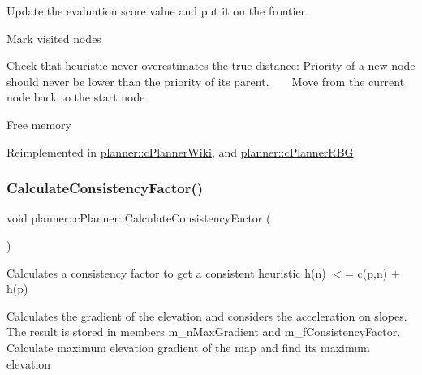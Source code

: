 Update the evaluation score value and put it on the frontier.

Mark visited nodes

Check that heuristic never overestimates the true distance\+: Priority of a new node should never be lower than the priority of its parent. ~\newline
~\newline
 Move from the current node back to the start node

Free memory 

Reimplemented in \mbox{\hyperlink{classplanner_1_1c_planner_wiki_a2652cf0e84d0a1fcd17e6c4288179955}{planner\+::c\+Planner\+Wiki}}, and \mbox{\hyperlink{classplanner_1_1c_planner_r_b_g_affd7011ef4df878a8e95ecf7f42c8e6f}{planner\+::c\+Planner\+R\+BG}}.

\mbox{\label{classplanner_1_1c_planner_a2e5a745f83f903662eff914d8beddb5e}} 
\subsubsection{\texorpdfstring{Calculate\+Consistency\+Factor()}{CalculateConsistencyFactor()}}
{\footnotesize\ttfamily void planner\+::c\+Planner\+::\+Calculate\+Consistency\+Factor (\begin{DoxyParamCaption}{ }\end{DoxyParamCaption})\hspace{0.3cm}{\ttfamily [protected]}}



Calculates a consistency factor to get a consistent heuristic h(n) $<$= c(p,n) + h(p) 

Calculates the gradient of the elevation and considers the acceleration on slopes. The result is stored in members m\+\_\+n\+Max\+Gradient and m\+\_\+f\+Consistency\+Factor. Calculate maximum elevation gradient of the map and find its maximum elevation \mbox{\label{classplanner_1_1c_planner_adbffc6ce05119c940a09369d7e61554e}} 
